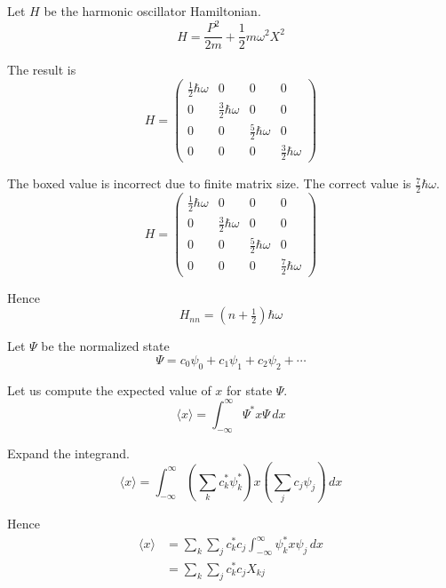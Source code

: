 Let $H$ be the harmonic oscillator Hamiltonian.
\begin{equation*}
H=\frac{P^2}{2m}+\frac{1}{2}m\omega^2 X^2
\end{equation*}

The result is
\begin{equation*}
H=\begin{pmatrix}
\tfrac{1}{2}\hbar\omega & 0 & 0 & 0
\\
0 & \tfrac{3}{2}\hbar\omega & 0 & 0
\\
0 & 0 & \tfrac{5}{2}\hbar\omega & 0
\\
0 & 0 & 0 & \boxed{\tfrac{3}{2}\hbar\omega}
\end{pmatrix}
\end{equation*}

The boxed value is incorrect due to finite matrix size.
The correct value is $\tfrac{7}{2}\hbar\omega$.
\begin{equation*}
H=\begin{pmatrix}
\tfrac{1}{2}\hbar\omega & 0 & 0 & 0
\\
0 & \tfrac{3}{2}\hbar\omega & 0 & 0
\\
0 & 0 & \tfrac{5}{2}\hbar\omega & 0
\\
0 & 0 & 0 & \tfrac{7}{2}\hbar\omega
\end{pmatrix}
\end{equation*}

Hence
\begin{equation*}
H_{nn}=\left(n+\tfrac{1}{2}\right)\hbar\omega
\end{equation*}

Let $\Psi$ be the normalized state
\begin{equation*}
\Psi=c_0\psi_0+c_1\psi_1+c_2\psi_2+\cdots
\end{equation*}

Let us compute the expected value of $x$ for state $\Psi$.
\begin{equation*}
\langle x\rangle=\int_{-\infty}^\infty \Psi^*x\Psi\,dx
\end{equation*}

Expand the integrand.
\begin{equation*}
\langle x\rangle
=\int_{-\infty}^\infty
\left(\sum_kc_k^*\psi_k^*\right) x \left(\sum_j c_j\psi_j\right)\,dx
\end{equation*}

Hence
\begin{align*}
\langle x\rangle&=\sum_k\sum_jc_k^*c_j\int_{-\infty}^\infty\psi_k^*x\psi_j\,dx
\\
&=\sum_k\sum_jc_k^*c_j X_{kj}
\end{align*}


